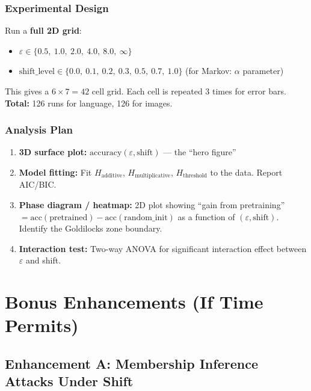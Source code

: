 \documentclass[11pt,a4paper]{article}
\begin{document}
\subsubsection{Experimental Design}

Run a \textbf{full 2D grid}:
\begin{itemize}[nosep]
    \item $\varepsilon \in \{0.5,\ 1.0,\ 2.0,\ 4.0,\ 8.0,\ \infty\}$
    \item $\text{shift\_level} \in \{0.0,\ 0.1,\ 0.2,\ 0.3,\ 0.5,\ 0.7,\ 1.0\}$ (for Markov: $\alpha$ parameter)
\end{itemize}

This gives a $6 \times 7 = 42$ cell grid. Each cell is repeated 3 times for error bars.\\
\textbf{Total:} 126 runs for language, 126 for images.

\subsubsection{Analysis Plan}

\begin{enumerate}[nosep]
    \item \textbf{3D surface plot:} $\text{accuracy}(\varepsilon, \text{shift})$ --- the ``hero figure''
    \item \textbf{Model fitting:} Fit $H_{\text{additive}}$, $H_{\text{multiplicative}}$, $H_{\text{threshold}}$ to the data. Report AIC/BIC.
    \item \textbf{Phase diagram / heatmap:} 2D plot showing ``gain from pretraining'' $= \text{acc}(\text{pretrained}) - \text{acc}(\text{random\_init})$ as a function of $(\varepsilon, \text{shift})$. Identify the Goldilocks zone boundary.
    \item \textbf{Interaction test:} Two-way ANOVA for significant interaction effect between $\varepsilon$ and shift.
\end{enumerate}

\section{Bonus Enhancements (If Time Permits)}

\subsection{Enhancement A: Membership Inference Attacks Under Shift}
\end{document}
